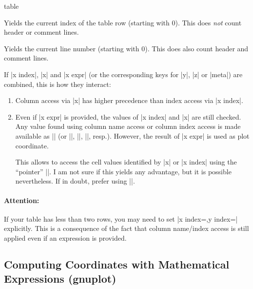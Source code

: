 {\begin{addplotoperation}[]{table}{}
    \begin{command}{\coordindex}
        Yields the current index of the table row (starting with $0$). This does
        \emph{not} count header or comment lines.
    \end{command}

    \begin{command}{\lineno}
        Yields the current line number (starting with $0$). This does also
        count header and comment lines.
    \end{command}

    If |x index|, |x| and |x expr| (or the corresponding keys for |y|, |z| or
    |meta|) are combined, this is how they interact:
    \begin{enumerate}
        \item Column access via |x| has higher precedence than index access
            via |x index|.
        \item Even if |x expr| is provided, the values of |x index| and |x|
            are still checked. Any value found using column name access or
            column index access is made available as |\columnx| (or
            |\columny|, |\columnz|, |\columnmeta|, resp.). However, the
            result of |x expr| is used as plot coordinate.

            This allows to access the cell values identified by |x| or
            |x index| using the ``pointer'' |\columnx|. I am not sure if this
            yields any advantage, but it is possible nevertheless. If in
            doubt, prefer using |\thisrow|.
    \end{enumerate}

    \paragraph{Attention:}

    If your table has less than two rows, you may need to set
    |x index={},y index={}| explicitly. This is a consequence of the fact that
    column name/index access is still applied even if an expression is provided.
\end{addplotoperation}


\subsection{Computing Coordinates with Mathematical Expressions (gnuplot)}

}
